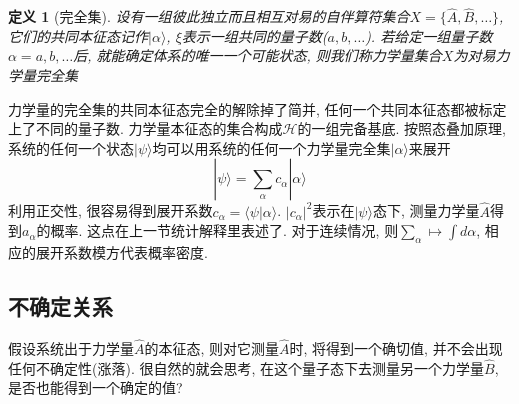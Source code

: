 \documentclass[a4paper,11pt]{book}
\newtheorem{definition}{\hspace{2em}定义}[section]
\newcommand{\A}{\hat{A}}
\newcommand{\B}{\hat{B}}
\begin{document}
\begin{definition}[完全集]
  设有一组彼此独立而且相互对易的自伴算符集合$X=\{\A,\B,\dots\}$, 它们的共同本征态记作$|\alpha\rangle$, $\xi$表示一组共同的量子数($a,b,\dots$). 若给定一组量子数$\alpha={a,b,\dots}$后, 就能确定体系的唯一一个可能状态, 则我们称力学量集合$X$为对易力学量完全集
\end{definition}
力学量的完全集的共同本征态完全的解除掉了简并, 任何一个共同本征态都被标定上了不同的量子数. 力学量本征态的集合构成$\mathcal{H}$的一组完备基底. 按照态叠加原理, 系统的任何一个状态$|\psi\rangle$均可以用系统的任何一个力学量完全集$|\alpha\rangle$来展开
\begin{equation*}
  |\psi\rangle=\sum_{\alpha}c_\alpha|\alpha\rangle
\end{equation*}
利用正交性, 很容易得到展开系数$c_\alpha=\langle\psi|\alpha\rangle$. $|c_\alpha|^2$表示在$|\psi\rangle$态下, 测量力学量$\A$得到$a_\alpha$的概率. 这点在上一节统计解释里表述了. 对于连续情况, 则$\sum_{\alpha}\longmapsto\int d\alpha$, 相应的展开系数模方代表概率密度.
\subsection{不确定关系}
假设系统出于力学量$\hat{A}$的本征态, 则对它测量$\hat{A}$时, 将得到一个确切值, 并不会出现任何不确定性(涨落). 很自然的就会思考, 在这个量子态下去测量另一个力学量$\hat{B}$, 是否也能得到一个确定的值?
\end{document}
